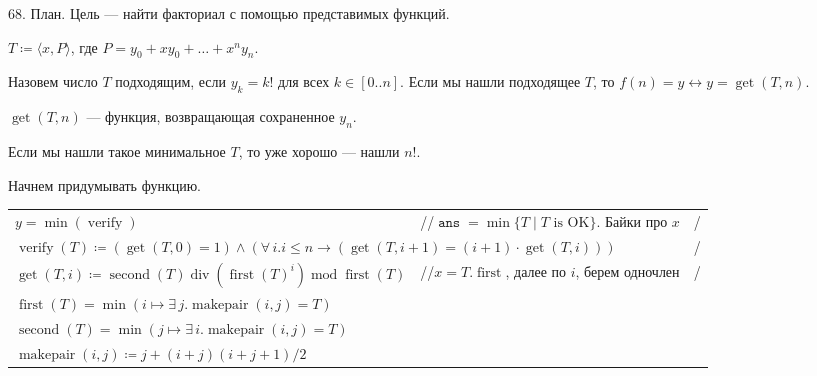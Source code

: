 \documentclass[12pt]{article}
\begin{document}
\bigskip

\newcommand{\getmin}{\mathop{\mathrm{min}}} %
\newcommand{\verify}{\mathop{\mathrm{verify}}} %
\newcommand{\geti}{\mathop{\mathrm{get}}} %
\newcommand{\ans}{\mathop{\texttt{ans}}}
\newcommand{\second}{\mathop{\mathrm{second}}} %
\newcommand{\first}{\mathop{\mathrm{first}}} %
\newcommand{\intdiv}{\mathop{\mathrm{div}}} %
\newcommand{\intmod}{\mathop{\mathrm{mod}}} %
\newcommand{\makepair}{\mathop{\mathrm{makepair}}} %


68. План. Цель --- найти факториал с помощью представимых функций.

$T\coloneqq\langle x, P\rangle$, где $P=y_0+x y_0+\ldots+x^n y_n$.

Назовем число $T$ подходящим, если $y_k=k!$ для всех $k\in[0..n]$.
Если мы нашли подходящее $T$, то $f(n)=y\leftrightarrow y=\geti(T, n)$.

$\geti(T,n)$ --- функция, возвращающая сохраненное $y_n$.

Если мы нашли такое минимальное $T$, то уже хорошо --- нашли $n!$.

Начнем придумывать функцию.

\begin{tabular*}{\textwidth}{l l r}
	$y=\getmin(\verify)$&//$\ans=\min\{T \mid T\text{ is OK}\}$. Байки про $x$&/\\
	\multicolumn{2}{l}{$\verify(T)\coloneqq (\geti(T, 0)=1)\wedge (\forall\,i.i\leqslant n\to (\geti(T,i+1)=(i+1)\cdot\geti(T, i)))$}&/\\
	$\geti(T,i)\coloneqq \second(T)\intdiv(\first(T)^i)\intmod\first(T)$&//$x=T.\first$, далее по $i$, берем одночлен&/\\
	$\first(T)=\getmin(i \mapsto \exists\,j.\makepair(i,j)=T)$&&\\
	$\second(T)=\getmin(j \mapsto \exists\,i.\makepair(i,j)=T)$&&\\
	$\makepair(i,j)\coloneqq j+(i+j)(i+j+1)/2$&&\\
\end{tabular*}
\end{document}
